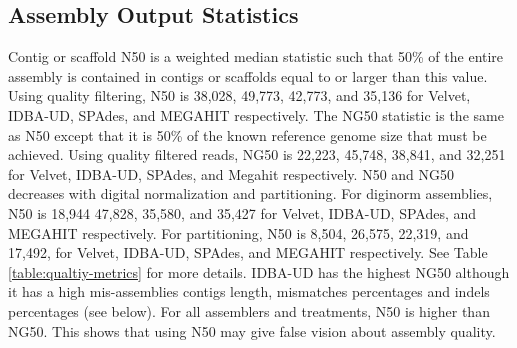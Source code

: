  



\subsection*{Assembly Output Statistics}



Contig or scaffold N50 is a weighted median statistic such that 50\% of the entire assembly is contained in contigs or scaffolds equal to or larger than this value. Using quality filtering, N50 is 38,028, 49,773,  42,773, and 35,136 for Velvet, IDBA-UD, SPAdes, and MEGAHIT respectively. The NG50 statistic is the same as N50 except that it is 50\% of the known reference genome size that must be achieved. Using quality filtered reads,  NG50 is 22,223, 45,748, 38,841, and 32,251 for Velvet, IDBA-UD, SPAdes, and Megahit respectively.  N50 and NG50 decreases with digital normalization and partitioning. For diginorm assemblies, N50 is 18,944 47,828, 35,580, and 35,427 for Velvet, IDBA-UD, SPAdes, and MEGAHIT respectively.  For partitioning, N50 is 8,504, 26,575, 22,319, and 17,492, for Velvet, IDBA-UD, SPAdes, and MEGAHIT respectively.  See Table \ref{table:qualtiy-metrics} for more details. 
IDBA-UD has the highest NG50 although it has a high mis-assemblies contigs length, mismatches percentages and indels percentages (see below). For all assemblers and treatments, N50 is higher than NG50. This shows that using N50 may give false vision about assembly quality. 


